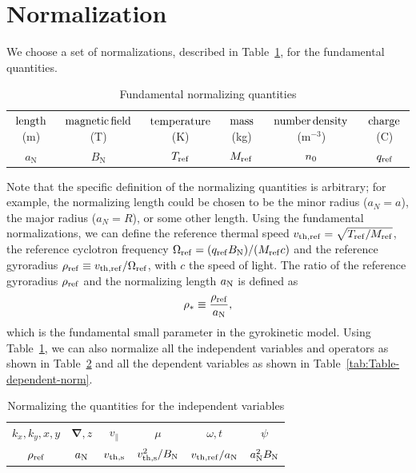 \documentclass{jpp}
\begin{document}
\section{Normalization} \label{app:norm}
We choose a set of normalizations, described in Table~\ref{tab:Table-fundamental-norm}, for the fundamental quantities.  
\begin{table}
\centering
\begin{tabular}{c|c|c|c|c|c}
 $\rm{length}$ (m) & $\rm{magnetic\, field}$ (T) & $\rm{temperature}$ (K) & $\rm{mass}$ (kg) & $\rm{number} \, \rm{density}$ (m$^{-3}$) & $\rm{charge}$ (C) \\[3pt]
 $a_\mathrm{N}$  & $B_\mathrm{N}$  & $T_{\rm{ref}}$ & $M_{\rm{ref}}$ & $n_{\rm{0}}$ & $q_{\rm{ref}}$\\
\end{tabular}
\caption{Fundamental normalizing quantities}
\label{tab:Table-fundamental-norm}
\end{table}
{\color{black} Note that the specific definition of the normalizing quantities is arbitrary; for example, the normalizing length could be chosen to be the minor radius ($a_N = a$), the major radius ($a_N = R$), or some other length.} 
Using the fundamental normalizations, we can define the reference thermal speed $v_{\rm{th, ref}} = \sqrt{T_{\rm{ref}}/M_{\rm{ref}}}$, the reference cyclotron frequency $\Omega_{\rm{ref}} = (q_{\rm{ref}} B_{\rm{N}})/(M_{\rm{ref}}c)$ and the reference gyroradius $\rho_{\rm{ref}}  \equiv v_{\rm{th, ref}}/\Omega_{\rm ref}$, with $c$ the speed of light. The ratio of the reference gyroradius $\rho_{\rm{ref}}$ and the normalizing length $a_{\rm{N}}$ is defined as
\begin{equation}
    \rho_{*} \equiv \frac{\rho_{\rm{ref}}}{a_{\rm{N}}},
\end{equation}
which is the fundamental small parameter in the gyrokinetic model. Using Table~\ref{tab:Table-fundamental-norm}, we can also normalize all the independent variables and operators as shown in Table~\ref{tab:Table-independent-norm} and all the dependent variables as shown in Table~\ref{tab:Table-dependent-norm}.
\begin{table}
\centering
\begin{tabular}{c|c|c|c|c|c}
 $k_x, k_y, x, y$ & $\boldsymbol{\nabla}, z$ & $v_\parallel$ & $\mu$ & $\omega, t$  & $\psi$ \\[3pt]
 $\rho_{\rm{ref}}$  & $a_{\rm{N}}$ & $v_{\rm{th},s}$ & $v_{\rm{th},s}^2{\color{black}/B_\mathrm{N}}$  & $v_{\rm{th, ref}}/a_{\rm{N}}$ & $a_{\rm{N}}^2B_{\rm{N}}$\\
\end{tabular}
\caption{Normalizing the quantities for the independent variables}
\label{tab:Table-independent-norm}
\end{table}
\end{document}
